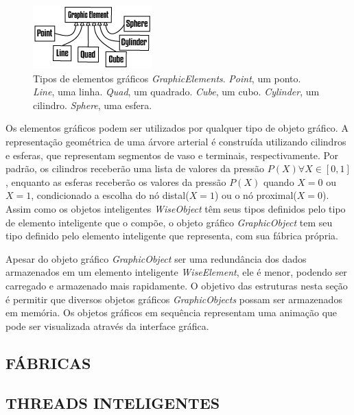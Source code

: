 \documentclass[
        english,			
        brazil			        %
        ,<...>]{abntbibufjf}
\begin{document}
\begin{figure}[!htbp]
	\centering
	\includegraphics[scale=1]{Figures/GraphicElements}
	\caption{Tipos de elementos gráficos \textit{GraphicElements}. \textit{Point}, um ponto. \textit{Line}, uma linha. \textit{Quad}, um quadrado. \textit{Cube}, um cubo. \textit{Cylinder}, um cilindro. \textit{Sphere}, uma esfera.}
	\label{fig7:graphicelements}
\end{figure}

Os elementos gráficos podem ser utilizados por qualquer tipo de objeto gráfico. A representação geométrica de uma árvore arterial é construída utilizando cilindros e esferas, que representam segmentos de vaso e terminais, respectivamente. Por padrão, os cilindros receberão uma lista de valores da pressão $P(X) \forall X \in [0,1]$, enquanto as esferas receberão os valores da pressão $P(X)$ quando $X=0$ ou $X=1$, condicionado a escolha do nó distal($X=1$) ou o nó proximal($X=0$).  Assim como os objetos inteligentes \textit{WiseObject} têm seus tipos definidos pelo tipo de elemento inteligente que o compõe, o objeto gráfico \textit{GraphicObject} tem seu tipo definido pelo elemento inteligente que representa, com sua fábrica própria.

Apesar do objeto gráfico \textit{GraphicObject} ser uma redundância dos dados armazenados em um elemento inteligente \textit{WiseElement}, ele é menor, podendo ser carregado e armazenado mais rapidamente. O objetivo das estruturas nesta seção é permitir que diversos objetos gráficos \textit{GraphicObjects} possam ser armazenados em memória. Os objetos gráficos em sequência representam uma animação que pode ser visualizada através da interface gráfica. 


\subsection{FÁBRICAS}\label{sec:fabricas} 



\subsection{THREADS INTELIGENTES}\label{sec:threads}
\end{document}
